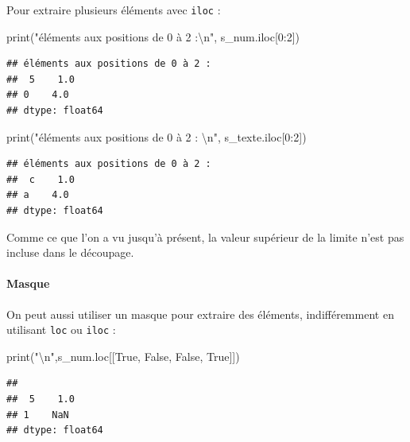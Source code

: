 \documentclass[12pt,]{book}
\newenvironment{Shaded}{\begin{snugshade}}{\end{snugshade}}
\newcommand{\DecValTok}[1]{\textcolor[rgb]{0.00,0.00,0.81}{#1}}
\newcommand{\CharTok}[1]{\textcolor[rgb]{0.31,0.60,0.02}{#1}}
\newcommand{\StringTok}[1]{\textcolor[rgb]{0.31,0.60,0.02}{#1}}
\newcommand{\VariableTok}[1]{\textcolor[rgb]{0.00,0.00,0.00}{#1}}
\newcommand{\BuiltInTok}[1]{#1}
\newcommand{\NormalTok}[1]{#1}
\let\oldparagraph\paragraph
\renewcommand{\paragraph}[1]{\oldparagraph{#1}\mbox{}}
\numberwithin{equation}{section}
\numberwithin{countremarque}{section}
\begin{document}
Pour extraire plusieurs éléments avec \texttt{iloc} :

\begin{Shaded}
\begin{Highlighting}[]
\BuiltInTok{print}\NormalTok{(}\StringTok{"éléments aux positions de 0 à 2 :}\CharTok{\textbackslash{}n}\StringTok{"}\NormalTok{, s_num.iloc[}\DecValTok{0}\NormalTok{:}\DecValTok{2}\NormalTok{])}
\end{Highlighting}
\end{Shaded}

\begin{lstlisting}
## éléments aux positions de 0 à 2 :
##  5    1.0
## 0    4.0
## dtype: float64
\end{lstlisting}

\begin{Shaded}
\begin{Highlighting}[]
\BuiltInTok{print}\NormalTok{(}\StringTok{"éléments aux positions de 0 à 2 : }\CharTok{\textbackslash{}n}\StringTok{"}\NormalTok{, s_texte.iloc[}\DecValTok{0}\NormalTok{:}\DecValTok{2}\NormalTok{])}
\end{Highlighting}
\end{Shaded}

\begin{lstlisting}
## éléments aux positions de 0 à 2 : 
##  c    1.0
## a    4.0
## dtype: float64
\end{lstlisting}

Comme ce que l'on a vu jusqu'à présent, la valeur supérieur de la limite
n'est pas incluse dans le découpage.

\paragraph{Masque}\label{masque}

On peut aussi utiliser un masque pour extraire des éléments,
indifféremment en utilisant \texttt{loc} ou \texttt{iloc} :

\begin{Shaded}
\begin{Highlighting}[]
\BuiltInTok{print}\NormalTok{(}\StringTok{"}\CharTok{\textbackslash{}n}\StringTok{"}\NormalTok{,s_num.loc[[}\VariableTok{True}\NormalTok{, }\VariableTok{False}\NormalTok{, }\VariableTok{False}\NormalTok{, }\VariableTok{True}\NormalTok{]])}
\end{Highlighting}
\end{Shaded}

\begin{lstlisting}
## 
##  5    1.0
## 1    NaN
## dtype: float64
\end{lstlisting}
\end{document}
